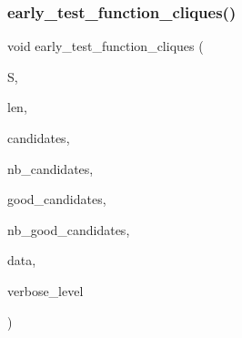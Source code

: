 \subsubsection{\texorpdfstring{early\+\_\+test\+\_\+function\+\_\+cliques()}{early\_test\_function\_cliques()}}
{\footnotesize\ttfamily void early\+\_\+test\+\_\+function\+\_\+cliques (\begin{DoxyParamCaption}\item[{\mbox{\hyperlink{galois_8h_a09fddde158a3a20bd2dcadb609de11dc}{I\+NT}} $\ast$}]{S,  }\item[{\mbox{\hyperlink{galois_8h_a09fddde158a3a20bd2dcadb609de11dc}{I\+NT}}}]{len,  }\item[{\mbox{\hyperlink{galois_8h_a09fddde158a3a20bd2dcadb609de11dc}{I\+NT}} $\ast$}]{candidates,  }\item[{\mbox{\hyperlink{galois_8h_a09fddde158a3a20bd2dcadb609de11dc}{I\+NT}}}]{nb\+\_\+candidates,  }\item[{\mbox{\hyperlink{galois_8h_a09fddde158a3a20bd2dcadb609de11dc}{I\+NT}} $\ast$}]{good\+\_\+candidates,  }\item[{\mbox{\hyperlink{galois_8h_a09fddde158a3a20bd2dcadb609de11dc}{I\+NT}} \&}]{nb\+\_\+good\+\_\+candidates,  }\item[{void $\ast$}]{data,  }\item[{\mbox{\hyperlink{galois_8h_a09fddde158a3a20bd2dcadb609de11dc}{I\+NT}}}]{verbose\+\_\+level }\end{DoxyParamCaption})}

\mbox{\label{draw__colored__graph_8_c_a76a03ce559765dd64a7e21f553acb888}} 
